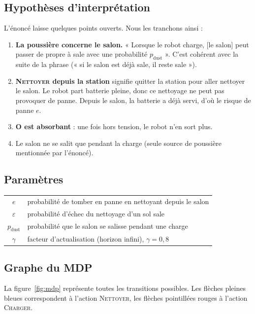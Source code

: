 \documentclass[11pt,a4paper]{article}
\newcommand{\N}{\textsc{Nettoyer}}
\newcommand{\C}{\textsc{Charger}}
\newcommand{\pd}{p_{\text{dust}}}
\begin{document}
\subsection{Hypothèses d'interprétation}

L'énoncé laisse quelques points ouverts. Nous les tranchons ainsi :
\begin{enumerate}
  \item \textbf{La poussière concerne le salon.} « Lorsque le robot charge, [le salon] peut passer de propre
        à sale avec une probabilité $\pd$ ». C'est cohérent avec la suite de la phrase (« si le salon est déjà sale,
        il reste sale »).
  \item \textbf{\N{} depuis la station} signifie quitter la station pour aller nettoyer le salon. Le robot part
        batterie pleine, donc ce nettoyage ne peut pas provoquer de panne. Depuis le salon, la batterie a déjà servi,
        d'où le risque de panne $e$.
  \item \textbf{O est absorbant} : une fois hors tension, le robot n'en sort plus.
  \item Le salon ne se salit que pendant la charge (seule source de poussière mentionnée par l'énoncé).
\end{enumerate}

\subsection{Paramètres}

\begin{center}
\begin{tabular}{>{$}c<{$} l}
\toprule
e & probabilité de tomber en panne en nettoyant depuis le salon \\
\varepsilon & probabilité d'échec du nettoyage d'un sol sale \\
\pd & probabilité que le salon se salisse pendant une charge \\
\gamma & facteur d'actualisation (horizon infini), $\gamma = 0{,}8$ \\
\bottomrule
\end{tabular}
\end{center}

\subsection{Graphe du MDP}

La figure~\ref{fig:mdp} représente toutes les transitions possibles. Les flèches pleines bleues
correspondent à l'action \N, les flèches pointillées rouges à l'action \C.
\end{document}
